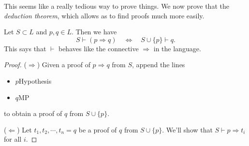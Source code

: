 \documentclass[a4paper]{article}
\begin{document}
This seems like a really tedious way to prove things. We now prove that the \emph{deduction theorem}, which allows as to find proofs much more easily.

\begin{prop}
  Let $S\subset L$ and $p, q\in L$. Then we have
  \[
    S\vdash (p\Rightarrow q)\quad \Leftrightarrow\quad S\cup \{p\} \vdash q.
  \]
  This says that $\vdash$ behaves like the connective $\Rightarrow $ in the language.
\end{prop}

\begin{proof}
  ($\Rightarrow $) Given a proof of $p\Rightarrow q$ from $S$, append the lines
  \begin{itemize}
    \item $p$\hfill Hypothesis
    \item $q$\hfill MP
  \end{itemize}
  to obtain a proof of $q$ from $S\cup \{p\}$.

  ($\Leftarrow$) Let $t_1, t_2, \cdots, t_n = q$ be a proof of $q$ from $S\cup \{p\}$. We'll show that $S\vdash p\Rightarrow t_i$ for all $i$.


\end{proof}
\end{document}
